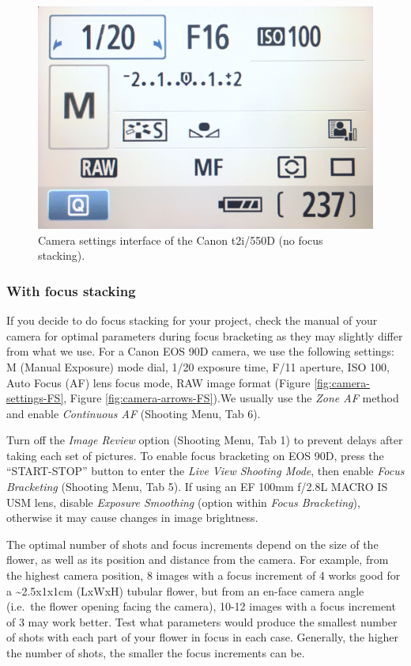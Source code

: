 \documentclass[
]{book}
\begin{document}
\begin{figure}

{\centering \includegraphics[width=0.5\linewidth]{Figures/camera_settings} 

}

\caption{Camera settings interface of the Canon t2i/550D (no focus stacking).}\label{fig:camera-settings-no-FS}
\end{figure}

\hypertarget{with-focus-stacking}{%
\subsubsection{With focus stacking}\label{with-focus-stacking}}

If you decide to do focus stacking for your project, check the manual of your camera for optimal parameters during focus bracketing as they may slightly differ from what we use. For a Canon EOS 90D camera, we use the following settings: M (Manual Exposure) mode dial, 1/20 exposure time, F/11 aperture, ISO 100, Auto Focus (AF) lens focus mode, RAW image format (Figure \ref{fig:camera-settings-FS}, Figure \ref{fig:camera-arrows-FS}).We usually use the \emph{Zone AF} method and enable \emph{Continuous AF} (Shooting Menu, Tab 6).

Turn off the \emph{Image Review} option (Shooting Menu, Tab 1) to prevent delays after taking each set of pictures. To enable focus bracketing on EOS 90D, press the ``START-STOP'' button to enter the \emph{Live View Shooting Mode}, then enable \emph{Focus Bracketing} (Shooting Menu, Tab 5). If using an EF 100mm f/2.8L MACRO IS USM lens, disable \emph{Exposure Smoothing} (option within \emph{Focus Bracketing}), otherwise it may cause changes in image brightness.

The optimal number of shots and focus increments depend on the size of the flower, as well as its position and distance from the camera. For example, from the highest camera position, 8 images with a focus increment of 4 works good for a \textasciitilde2.5x1x1cm (LxWxH) tubular flower, but from an en-face camera angle (i.e.~the flower opening facing the camera), 10-12 images with a focus increment of 3 may work better. Test what parameters would produce the smallest number of shots with each part of your flower in focus in each case. Generally, the higher the number of shots, the smaller the focus increments can be.
\end{document}
